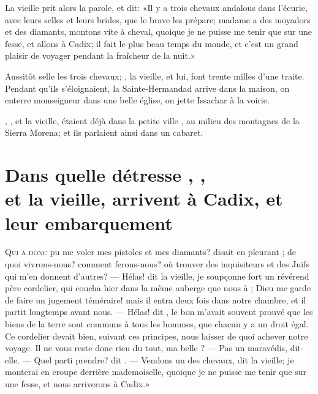 La vieille prit alors la parole, et dit: «Il y a trois chevaux andalous
dans l’écurie, avec leurs selles et leurs brides, que le brave 
les prépare; madame a des moyadors et des diamants, montons vite à
cheval, quoique je ne puisse me tenir que sur une fesse, et allons à
Cadix; il fait le plus beau temps du monde, et c’est un grand plaisir
de voyager pendant la fraîcheur de la nuit.»

Aussitôt  selle les trois chevaux; , la vieille, et
lui, font trente milles d’une traite. Pendant qu’ils s’éloignaient, la
Sainte-Hermandad arrive dans la maison, on enterre monseigneur dans une
belle église, on jette Issachar à la voirie.

, , et la vieille, étaient déjà dans la petite ville
, au milieu des montagnes de la Sierra Morena; et ils
parlaient ainsi dans un cabaret.




\chapter[Dans quelle détresse Candide…]{Dans quelle détresse , ,\\et la vieille, arrivent à
Cadix, et leur embarquement}


\lettrine[ante={«}]{Q}{ui a donc} pu me voler mes pistoles et mes diamants? disait en pleurant
; de quoi vivrons-nous? comment ferons-nous? où trouver des
inquisiteurs et des Juifs qui m’en donnent d’autres? — Hélas! dit la
vieille, je soupçonne fort un révérend père cordelier, qui coucha hier
dans la même auberge que nous à ; Dieu me garde de faire un
jugement téméraire! mais il entra deux fois dans notre chambre, et il
partit longtemps avant nous. — Hélas! dit , le bon 
m’avait souvent prouvé que les biens de la terre sont communs à tous
les hommes, que chacun y a un droit égal. Ce cordelier devait bien,
suivant ces principes, nous laisser de quoi achever notre voyage. Il ne
vous reste donc rien du tout, ma belle ? — Pas un maravédis,
dit-elle. — Quel parti prendre? dit . — Vendons un des chevaux, dit
la vieille; je monterai en croupe derrière mademoiselle, quoique je ne
puisse me tenir que sur une fesse, et nous arriverons à Cadix.»

